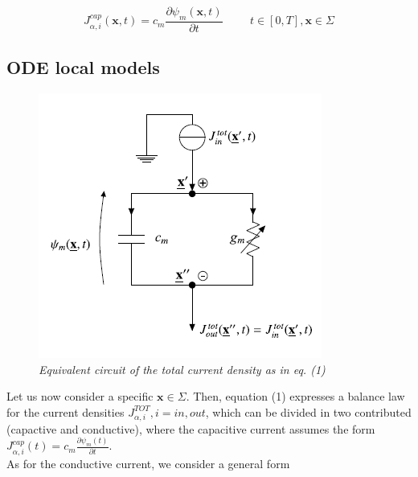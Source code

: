 \documentclass[a4paper]{article}
\begin{document}
\begin{equation}
	J^{cap}_{\alpha,i}(\textbf{x},t) = c_m \frac{\partial \psi_m(\textbf{x},t)}{\partial t}  \hspace{1cm} t \in [0,T], \textbf{x} \in \Sigma
\end{equation}
	
	
\subsection{ODE local models}
	
	
\begin{figure}[H]
	\begin{center}
		\includegraphics[scale=0.95]{ode_circuit.png} 
	\end{center} 
	\caption{\textit{Equivalent circuit of the total current density as in eq. (1)}}
	
\end{figure}
	
	Let us now consider a specific $\textbf{x} \in \Sigma$. Then, equation (1) expresses a balance law for the current densities $J_{\alpha,i}^{TOT}, i= in,out$, which can be divided in two contributed (capactive and conductive), where the capacitive current assumes the form $J^{cap}_{\alpha,i}(t) = c_m \frac{\partial \psi_m(t)}{\partial t}$.\\
	As for the conductive current, we consider a general form 
	
	
	
	
	
	
	
	
	
	
	
\end{document}
